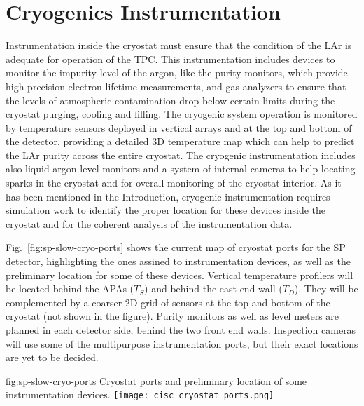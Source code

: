 \section{Cryogenics Instrumentation}
\label{sec:fdsp-cryo-instr} %
\label{sec:fddp-cryo-instr} %
\label{sec:fdgen-cryo-instr} %

Instrumentation inside the cryostat must ensure that the condition of the LAr is adequate for operation of the TPC.
This instrumentation includes devices to monitor the impurity level of the argon, like the purity monitors, which provide high precision electron lifetime measurements,
and gas analyzers to ensure that the levels of atmospheric contamination drop below certain limits during the cryostat purging, cooling and filling.
The cryogenic system operation is monitored by temperature sensors deployed in vertical arrays and at the top and bottom of the detector, providing a 
detailed 3D temperature map which can help to predict the LAr purity across the entire cryostat. The cryogenic instrumentation includes also liquid argon level monitors and
a system of internal cameras to help locating sparks in the cryostat and for overall monitoring of the cryostat interior. 
As it has been mentioned in the Introduction, cryogenic instrumentation requires simulation work to identify the proper location for these devices inside the cryostat and
for the coherent analysis of the instrumentation data. 


Fig.~\ref{fig:sp-slow-cryo-ports} shows the current map of cryostat ports for the SP detector, highlighting the ones assined to instrumentation devices,
as well as the preliminary location for some of these devices. Vertical temperature profilers will be located behind the APAs ($T_S$) and behind the east end-wall ($T_D$).
They will be complemented by a coarser 2D grid of sensors at the top and bottom of the cryostat (not shown in the figure). Purity monitors as well as level meters are planned
in each detector side, behind the two front end walls. Inspection cameras will use some of the multipurpose instrumentation ports, but their exact locations are yet to be decided. 

\begin{dunefigure}{fig:sp-slow-cryo-ports}
{Cryostat ports and preliminary location of some instrumentation devices. }
\texttt{[image: cisc\_cryostat\_ports.png]}
\end{dunefigure}




